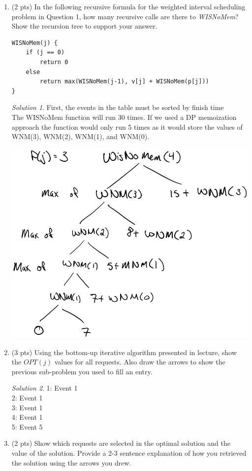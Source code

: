 \documentclass[12pt]{article}
\theoremstyle{remark}
\newtheorem*{solution}{Solution}
\begin{document}
\begin{enumerate}
\begin{enumerate}
\pagebreak
\item (2 pts) In the following recursive formula for the weighted interval scheduling problem in Question 1, how many recursive calls are there to \textit{WISNoMem}? Show the recursion tree to support your answer.
\begin{verbatim}
WISNoMem(j) {
    if (j == 0) 
        return 0
    else 
        return max(WISNoMem(j-1), v[j] + WISNoMem(p[j]))
}
\end{verbatim}

\begin{solution}
First, the events in the table must be sorted by finish time\\
The WISNoMem function will run 30 times. If we used a DP memoization approach the function would only run 5 times as it would store the values of WNM(3), WNM(2), WNM(1), and WNM(0). \\
\begin{center}
\includegraphics[scale = 0.6]{PS10a_Q1c.png}
\end{center}
\end{solution}

\pagebreak
\item (3 pts) Using the bottom-up iterative algorithm presented in lecture, show the $OPT(j)$ values for all requests. Also draw the arrows to show the previous sub-problem you used to fill an entry. 
\begin{solution}
1: Event 1 \\
2: Event 1 \\
3: Event 1 \\
4: Event 1 \\
5: Event 5
\end{solution}
\item (2 pts) Show which requests are selected in the optimal solution and the value of the solution. Provide a 2-3 sentence explanation of how you retrieved the solution using the arrows you drew.


\end{enumerate}
\end{enumerate}
\end{document}
